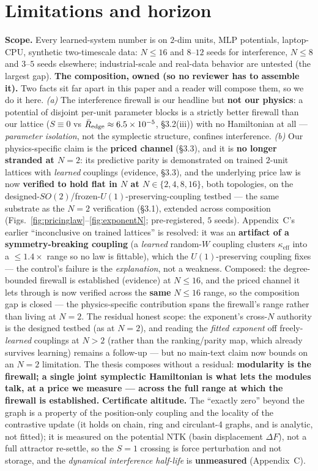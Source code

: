 \documentclass[11pt]{article}
\newcommand{\keff}{\kappa_{\mathrm{eff}}}
\begin{document}
\section{Limitations and horizon}
\textbf{Scope.} Every learned-system number is on $2$-dim units, MLP potentials, laptop-CPU, synthetic two-timescale data: $N\le16$ and $8$--$12$ seeds for interference, $N\le8$ and $3$--$5$ seeds elsewhere; industrial-scale and real-data behavior are untested (the largest gap). \textbf{The composition, owned (so no reviewer has to assemble it).} Two facts sit far apart in this paper and a reader will compose them, so we do it here. \emph{(a)} The interference firewall is our headline but \textbf{not our physics}: a potential of disjoint per-unit parameter blocks is a strictly better firewall than our lattice ($S\equiv0$ vs $\bar R_{\rm edge}\approx6.5\times10^{-5}$, \S3.2(iii)) with no Hamiltonian at all --- \emph{parameter isolation}, not the symplectic structure, confines interference. \emph{(b)} Our physics-specific claim is the \textbf{priced channel} (\S3.3), and it is \textbf{no longer stranded at $N=2$}: its predictive parity is demonstrated on trained $2$-unit lattices with \emph{learned} couplings (evidence, \S3.3), and the underlying price law is now \textbf{verified to hold flat in $N$ at $N\in\{2,4,8,16\}$}, both topologies, on the designed-$SO(2)$/frozen-$U(1)$-preserving-coupling testbed --- the same substrate as the $N=2$ verification (\S3.1), extended across composition (Figs.~\ref{fig:pricinglaw}--\ref{fig:exponentN}; pre-registered, $5$ seeds). Appendix~C's earlier ``inconclusive on trained lattices'' is resolved: it was an \textbf{artifact of a symmetry-breaking coupling} (a \emph{learned} random-$W$ coupling clusters $\keff$ into a $\le1.4\times$ range so no law is fittable), which the $U(1)$-preserving coupling fixes --- the control's failure is the \emph{explanation}, not a weakness. Composed: the degree-bounded firewall is established (evidence) at $N\le16$, and the priced channel it lets through is now verified across the \textbf{same} $N\le16$ range, so the composition gap is closed --- the physics-specific contribution spans the firewall's range rather than living at $N=2$. The residual honest scope: the exponent's cross-$N$ authority is the designed testbed (as at $N=2$), and reading the \emph{fitted exponent} off freely-\emph{learned} couplings at $N>2$ (rather than the ranking/parity map, which already survives learning) remains a follow-up --- but no main-text claim now bounds on an $N=2$ limitation. The thesis composes without a residual: \textbf{modularity is the firewall; a single joint symplectic Hamiltonian is what lets the modules talk, at a price we measure --- across the full range at which the firewall is established.} \textbf{Certificate altitude.} The ``exactly zero'' beyond the graph is a property of the position-only coupling and the locality of the contrastive update (it holds on chain, ring and circulant-4 graphs, and is analytic, not fitted); it is measured on the potential NTK (basin displacement $\Delta F$), not a full attractor re-settle, so the $S=1$ crossing is force perturbation and not storage, and the \emph{dynamical interference half-life} is \textbf{unmeasured} (Appendix~C). 
\end{document}
